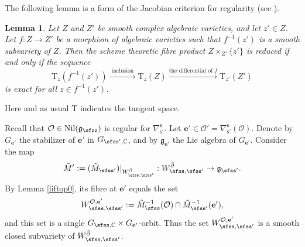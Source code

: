 \documentclass[12pt,a4paper]{amsart}
\newcommand{\CO}{{\mathcal {O}}}
\newcommand{\g}{\mathfrak g}
\newcommand{\X}{\mathbf{X}}
\def\DD{\nabla}
\newcommand{\be}{\begin {equation}}
\newcommand{\ee}{\end {equation}}
\numberwithin{equation}{section}
\newtheorem{lem}[thm]{Lemma}
\theoremstyle{remark}
\def\cOp{\cO^{\prime}}
\begin{document}
\def\Ks{{K}_{\sfss}}
\def\Ksp{{K}_{\sfss'}}
\def\Kspo{{K}_{\sfss'_0}}
\def\Kspt{{K}_{\sfss'_1}}

\def\Gs{{G}_{\sfss}}
\def\Gsp{{G}_{\sfss'}}
\def\Gspo{{G}_{\sfss'_0}}
\def\Gspt{{G}_{\sfss'_1}}
\def\CMs{{\tilde M}_{\sfss}}
\def\CMsp{{\tilde M}_{\sfss'}}
\def\CMss{{\tilde M}_{\sfss,\sfss'}}
\def\Wss{{W_{\sfss,\sfss'}}}
\def\Woss{{W^{\circ}_{\sfss,\sfss'}}}
\def\CXss{\cX_{\sfss,\sfss'}}
\def\X{\bfee}
\def\Xp{{\bfee'}}
\def\Xpo{{\bfee'_0}}
\def\ww{\phi}
\def\wwo{\phi_0}
\def\sOp{\sO'}
\def\fggpsb{{\fgg^{\boxslash}_{\sfss'}}}
\def\fpppsb{{\fpp^{\boxslash}_{\sfss'}}}
\def\fpppso{\fpp_{\sfss'_0}}
\def\fpppst{\fpp_{\sfss'_1}}

\def\Vs{V_\sfss}
\def\Vsp{V_{\sfss'}}
\def\Vspp{V_{\sfss''}}
\def\Vspo{V_{\sfss'_0}}
\def\Vspt{V_{\sfss'_1}}
\def\Vspi{V_{\sfss'_i}}
\def\Wssi{W_{\sfss,\sfss'_i}}
\def\Wsso{W_{\sfss,\sfss'_0}}
\def\Wsst{W_{\sfss,\sfss'_1}}

\def\CXUO{\cX_{\sfss,\sfss'}^{\bar\partial ,\cOp}}
\def\CXOO{\cX_{\sfss,\sfss'}^{\cO ,\cOp}}



The following lemma is a form of  the Jacobian criterion for
regularity (see \cite[Theorem~2.19]{LiuAG}).
\begin{lem}\label{jacobic}
Let $Z$ and $Z'$ be smooth complex algebraic varieties, and let $z'\in Z$. Let $f: Z\rightarrow Z'$ be a morphism of algebraic varieties such that $f^{-1}(z')$ is a smooth subvariety of $Z$. Then the scheme theoretic fibre product $Z\times_{Z'} \{z'\}$ is reduced if and only if the sequence 
\be\label{jc0}
  \mathrm T_z(f^{-1}(z'))\xrightarrow{\textrm{ inclusion }} \mathrm T_z(Z)\xrightarrow{\textrm{the differential of $f$}} \mathrm T_{z'}(Z')
\ee
is exact for all $z\in f^{-1}(z')$. 
\end{lem}

Here and as usual $\mathrm T$ indicates the tangent space. 

Recall that  $\CO\in \mathrm{Nil}(\g_\sfss)$ is regular for $\DD_{\mathsf s'}^{\mathsf s}$. 
Let $\mathbf e'\in \CO'=\DD_{\mathsf s'}^{\mathsf s}(\CO)$. Denote by $G_{\mathbf e'}$ the stabilizer of $\mathbf e'$ in $G_{\sfss',\C}$, and by $\g_{\mathbf e'}$ the Lie algebra of $G_{\mathbf e'}$. Consider the map
\[
 \tilde M':=  (\tilde M_{\sfss'})|_{W_{\sfss, \sfss'}^{\bar \partial}} : W_{\sfss, \sfss'}^{\bar \partial}\rightarrow \g_{\sfss'}. 
\]
By Lemma \ref{liftop0}, its fibre at $\mathbf e'$ equals the set
\[
W_{\sfss, \sfss'}^{\CO, \mathbf e'}:=\tilde M_{\sfss}^{-1}(\CO)\cap  \tilde M_{\sfss'}^{-1}(\mathbf e'),
\]
and this set is a single $G_{\sfss,\C}\times G_{\mathbf e'}$-orbit. Thus the set $W_{\sfss, \sfss'}^{\CO, \mathbf e'}$ is a smooth closed subvariety of $W_{\sfss, \sfss'}^{\bar \partial}$. 
\end{document}
